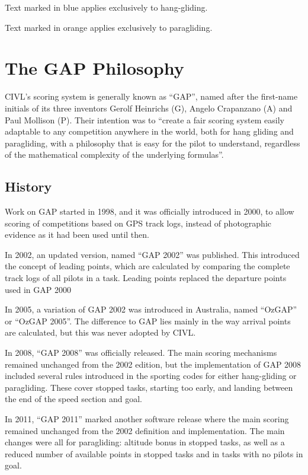 \documentclass{article}
\begin{document}
\begin{hg}
Text marked in blue applies exclusively to hang-gliding.
\end{hg}

\begin{pg}
Text marked in orange applies exclusively to paragliding.
\end{pg}

\newpage
\section{The GAP Philosophy}
CIVL’s scoring system is generally known as “GAP”, named after the first-name
initials of its three inventors Gerolf Heinrichs (G), Angelo Crapanzano (A) and
Paul Mollison (P). Their intention was to “create a fair scoring system easily
adaptable to any competition anywhere in the world, both for hang gliding and
paragliding, with a philosophy that is easy for the pilot to understand,
regardless of the mathematical complexity of the underlying formulas”.

\subsection{History}
Work on GAP started in 1998, and it was officially introduced in 2000, to allow
scoring of competitions based on GPS track logs, instead of photographic
evidence as it had been used until then.

In 2002, an updated version, named “GAP 2002” was published. This introduced
the concept of leading points, which are calculated by comparing the complete
track logs of all pilots in a task. Leading points replaced the departure
points used in GAP 2000

In 2005, a variation of GAP 2002 was introduced in Australia, named “OzGAP” or
“OzGAP 2005”. The difference to GAP lies mainly in the way arrival points are
calculated, but this was never adopted by CIVL.

In 2008, “GAP 2008” was officially released. The main scoring mechanisms
remained unchanged from the 2002 edition, but the implementation of GAP 2008
included several rules introduced in the sporting codes for either hang-gliding
or paragliding. These cover stopped tasks, starting too early, and landing
between the end of the speed section and goal.

In 2011, “GAP 2011” marked another software release where the main scoring
remained unchanged from the 2002 definition and implementation. The main
changes were all for paragliding: altitude bonus in stopped tasks, as well as
a reduced number of available points in stopped tasks and in tasks with no
pilots in goal.
\end{document}
